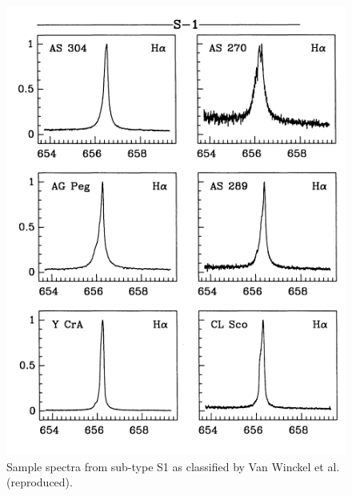 \begin{figure}[!htb]
\centering
\includegraphics[scale=0.75]{figures/van winckel class.png}
\caption{Sample spectra from sub-type S1 as classified by Van Winckel et al. (reproduced).}
\end{figure}

